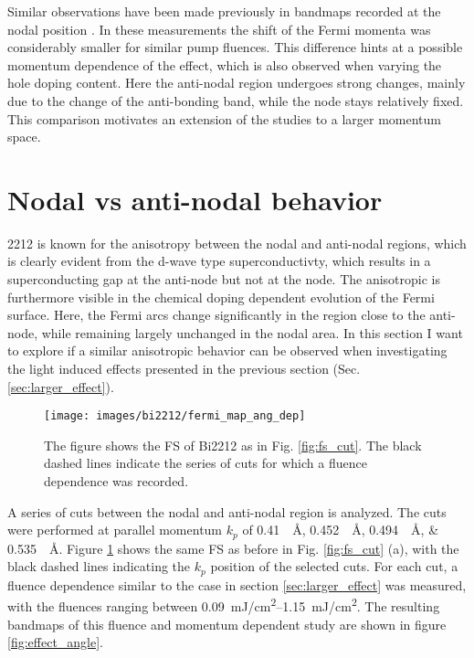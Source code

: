 Similar observations have been made previously in bandmaps recorded at the nodal position \cite{rameau_photoinduced_2014}.
In these measurements the shift of the Fermi momenta was considerably smaller for similar pump fluences.
This difference hints at a possible momentum dependence of the effect, which is also observed when varying the hole doping content.
Here the anti-nodal region undergoes strong changes, mainly due to the change of the anti-bonding band, while the node stays relatively fixed.
This comparison motivates an extension of the studies to a larger momentum space.

\section{Nodal vs anti-nodal behavior}
\label{sec:angle}

2212 is known for the anisotropy between the nodal and anti-nodal regions, which is clearly evident from the d-wave type superconductivty, which results in a superconducting gap at the anti-node but not at the node.
The anisotropic is furthermore visible in the chemical doping dependent evolution of the Fermi surface.
Here, the Fermi arcs change significantly in the region close to the anti-node, while remaining largely unchanged in the nodal area.
In this section I want to explore if a similar anisotropic behavior can be observed when investigating the light induced effects presented in the previous section (Sec. \ref{sec:larger_effect}).

\begin{figure}[t]
	\centering
	\texttt{[image: images/bi2212/fermi\_map\_ang\_dep]}
	\caption{The figure shows the FS of Bi2212 as in Fig. \ref{fig:fs_cut}. The black dashed lines indicate the series of cuts for which a fluence dependence was recorded.}
	\label{fig:fermimap_angdep}
\end{figure}

A series of cuts between the nodal and anti-nodal region is analyzed.
The cuts were performed at parallel momentum $k_p$ of \qtylist{0.41;0.452;0.494;0.535}{\per\angstrom}.
Figure \ref{fig:fermimap_angdep} shows the same FS as before in Fig. \ref{fig:fs_cut} (a), with the black dashed lines indicating the $k_p$ position of the selected cuts.
For each cut, a fluence dependence similar to the case in section \ref{sec:larger_effect} was measured, with the fluences ranging between \qtyrange{0.09}{1.15}{\milli\joule/\centi\meter\squared}.
The resulting bandmaps of this fluence and momentum dependent study are shown in figure \ref{fig:effect_angle}.

